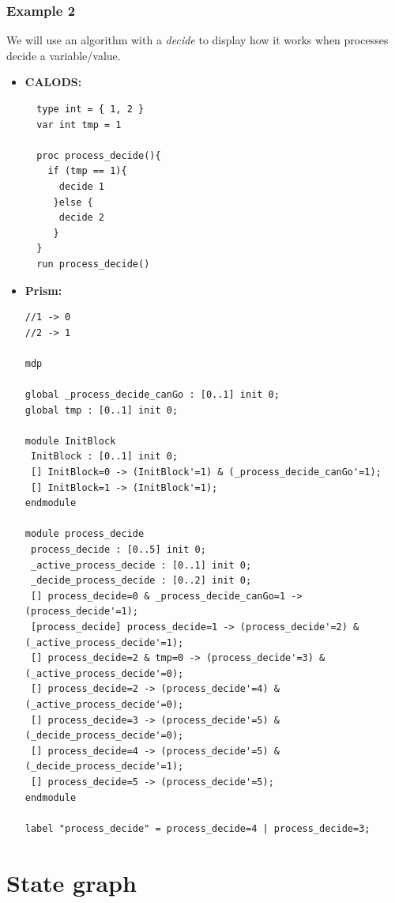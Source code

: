 \documentclass{article}
\begin{document}
\subsubsection{Example 2}
We will use an algorithm with a \textit{decide} to display how it works when processes decide a variable/value.
\begin{itemize}
  \item{\textbf{CALODS:}
  \begin{lstlisting}
  type int = { 1, 2 }
  var int tmp = 1

  proc process_decide(){
    if (tmp == 1){
      decide 1
     }else {
      decide 2
     }  
  }
  run process_decide()
  \end{lstlisting}
  }
  \item{\textbf{Prism:}
  \begin{lstlisting}
//1 -> 0
//2 -> 1

mdp

global _process_decide_canGo : [0..1] init 0;
global tmp : [0..1] init 0;

module InitBlock
 InitBlock : [0..1] init 0;
 [] InitBlock=0 -> (InitBlock'=1) & (_process_decide_canGo'=1);
 [] InitBlock=1 -> (InitBlock'=1);
endmodule

module process_decide
 process_decide : [0..5] init 0;
 _active_process_decide : [0..1] init 0;
 _decide_process_decide : [0..2] init 0;
 [] process_decide=0 & _process_decide_canGo=1 -> (process_decide'=1);
 [process_decide] process_decide=1 -> (process_decide'=2) & (_active_process_decide'=1);
 [] process_decide=2 & tmp=0 -> (process_decide'=3) & (_active_process_decide'=0);
 [] process_decide=2 -> (process_decide'=4) & (_active_process_decide'=0);
 [] process_decide=3 -> (process_decide'=5) & (_decide_process_decide'=0);
 [] process_decide=4 -> (process_decide'=5) & (_decide_process_decide'=1);
 [] process_decide=5 -> (process_decide'=5);
endmodule

label "process_decide" = process_decide=4 | process_decide=3;

  \end{lstlisting}
  }
\end{itemize}
  
\newpage


\section{State graph}
\end{document}
